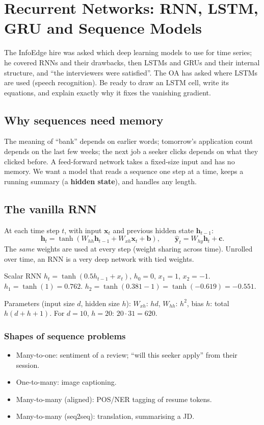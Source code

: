 \chapter{Recurrent Networks: RNN, LSTM, GRU and Sequence Models}

The InfoEdge hire was asked which deep learning models to use for time series; he covered RNNs and their drawbacks, then LSTMs and GRUs and
their internal structure, and ``the interviewers were satisfied''. The OA has asked where LSTMs are used (speech recognition). Be ready to
draw an LSTM cell, write its equations, and explain exactly why it fixes the vanishing gradient.

\section{Why sequences need memory}
The meaning of ``bank'' depends on earlier words; tomorrow's application count depends on the last few weeks; the next job a seeker clicks
depends on what they clicked before. A feed-forward network takes a fixed-size input and has no memory. We want a model that reads a
sequence one step at a time, keeps a running summary (a \textbf{hidden state}), and handles any length.

\section{The vanilla RNN}
At each time step $t$, with input $\mathbf x_t$ and previous hidden state $\mathbf h_{t-1}$:
\[ \mathbf h_t = \tanh(W_{hh}\mathbf h_{t-1} + W_{xh}\mathbf x_t + \mathbf b),\qquad \hat{\mathbf y}_t = W_{hy}\mathbf h_t + \mathbf c. \]
The \emph{same} weights are used at every step (weight sharing across time). Unrolled over time, an RNN is a very deep network with tied weights.
\begin{example}
Scalar RNN $h_t = \tanh(0.5h_{t-1} + x_t)$, $h_0 = 0$, $x_1 = 1$, $x_2 = -1$. $h_1 = \tanh(1) = 0.762$. $h_2 = \tanh(0.381 - 1) = \tanh(-0.619) = -0.551$.
\end{example}
Parameters (input size $d$, hidden size $h$): $W_{xh}$: $hd$, $W_{hh}$: $h^2$, bias $h$: total $h(d + h + 1)$. For $d = 10$, $h = 20$: $20\cdot31 = 620$.

\subsection{Shapes of sequence problems}
\begin{itemize}
\item Many-to-one: sentiment of a review; ``will this seeker apply'' from their session.
\item One-to-many: image captioning.
\item Many-to-many (aligned): POS/NER tagging of resume tokens.
\item Many-to-many (seq2seq): translation, summarising a JD.
\end{itemize}

